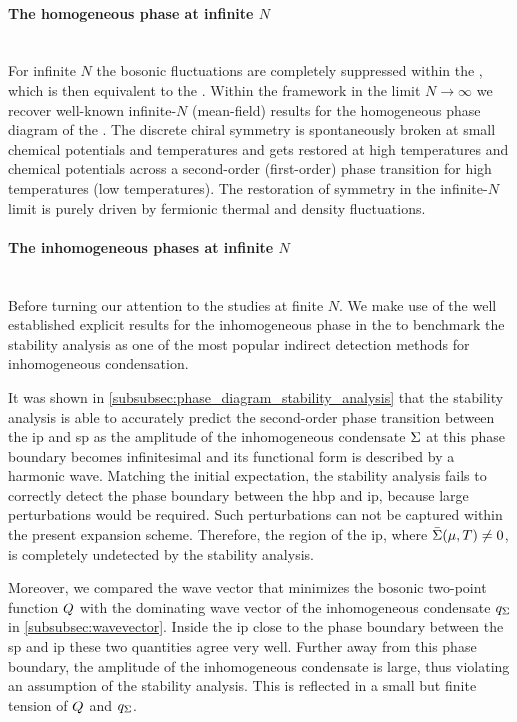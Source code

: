 \paragraph{The homogeneous phase at infinite $N$}\label{paragraph:gnConHomo}\mbox{}\\%
For infinite $N$ the bosonic fluctuations are completely suppressed within the \gnym{}, which is then equivalent to the \gnm{}.
Within the \frg{} framework in the limit $N \rightarrow \infty$ we recover well-known infinite-$N$ (mean-field) results for the homogeneous phase diagram of the \gnm{}. 
The discrete chiral \ZII{} symmetry is spontaneously broken at small chemical potentials and temperatures and gets restored at high temperatures and chemical potentials across a second-order (first-order) phase transition for high temperatures (low temperatures). The restoration of \ZII{} symmetry in the infinite-$N$ limit is purely driven by fermionic thermal and density fluctuations.

\paragraph{The inhomogeneous phases at infinite $N$}\label{paragraph:gnConInhomo}\mbox{}\\%
Before turning our attention to the \frg{} studies at finite $N$. We make use of the well established explicit results for the inhomogeneous phase in the \gnm{} to benchmark the stability analysis as one of the most popular indirect detection methods for inhomogeneous condensation.

It was shown in \cref{subsubsec:phase_diagram_stability_analysis} that the stability analysis is able to accurately predict the second-order phase transition between the \gls{ip} and \gls{sp} as the amplitude of the inhomogeneous condensate $\Sigma$ at this phase boundary becomes infinitesimal and its functional form is described by a harmonic wave.
Matching the initial expectation, the stability analysis fails to correctly detect the phase boundary between the \gls{hbp} and \gls{ip}, because large perturbations would be required.
Such perturbations can not be captured within the present expansion scheme.
Therefore, the region of the \gls{ip}, where $\bar{\Sigma} (\mu, T)\neq 0$, is completely undetected by the stability analysis. 

Moreover, we compared the wave vector that minimizes the bosonic two-point function $Q $ with the dominating wave vector of the inhomogeneous condensate $q_{\Sigma}$ in \cref{subsubsec:wavevector}.
Inside the \gls{ip} close to the phase boundary between the \gls{sp} and \gls{ip} these two quantities agree very well.
Further away from this phase boundary, the amplitude of the inhomogeneous condensate is large, thus violating an assumption of the stability analysis.
This is reflected in a small but finite tension of $Q$ and $q_{\Sigma}$.


